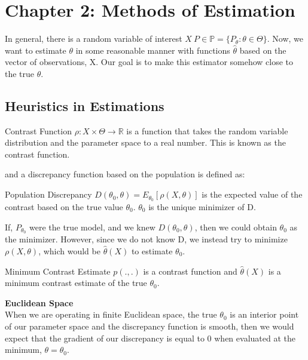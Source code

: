 \section{Chapter 2: Methods of Estimation}
	
	In general, there is a random variable of interest $X ~ P \in \mathbb{P} = \{P_\theta : \theta \in \Theta \}$. Now, we want to estimate $\theta$ in some reasonable manner with functions $\hat{\theta}$ based on the vector of observations, X. Our goal is to make this estimator somehow close to the true $\theta$. 

	\subsection{Heuristics in Estimations}
		\begin{definition}{Contrast Function}
		$\rho : X \times \Theta \rightarrow \mathbb{R}$ is a function that takes the random variable distribution and the parameter space to a real number. This is known as the contrast function.
		\end{definition}

		and a discrepancy function based on the population is defined as:

		\begin{definition}{Population Discrepancy}
		$D(\theta_0, \theta) = E_{\theta_0} [ \rho (X, \theta) ]$ is the expected value of the contrast based on the true value $\theta_0$. $\theta_0$ is the unique minimizer of D. 
		\end{definition}

		If, $P_{\theta_0}$ were the true model, and we knew $D(\theta_0, \theta)$, then we could obtain $\theta_0$ as the minimizer. However, since we do not know D, we instead try to minimize $\rho(X, \theta)$, which would be $\hat{\theta}(X)$ to estimate $\theta_0$. 

		\begin{definition}{Minimum Contrast Estimate}
		$p(., .)$ is a contrast function and $\hat{\theta}(X)$ is a minimum contrast estimate of the true $\theta_0$.
		\end{definition}

		\textbf{Euclidean Space}\\
		When we are operating in finite Euclidean space, the true $\theta_0$ is an interior point of our parameter space and the discrepancy function is smooth, then we would expect that the gradient of our discrepancy is equal to 0 when evaluated at the minimum, $\theta = \theta_0$.

